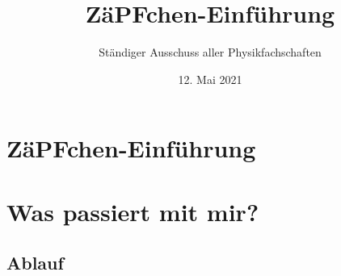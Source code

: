 \documentclass[compress,]{beamer}
\title[ZäPFchen-Einführung]{ZäPFchen-Einführung}
\author{Ständiger Ausschuss aller Physikfachschaften}
\institute[Zusammenkunft aller Physikfachschaften]
\date{12. Mai 2021}
\begin{document}
\begin{frame}
  \titlepage

\end{frame}

\section{ZäPFchen-Einführung}



\section{Was passiert mit mir?}

\subsection{Ablauf}
\end{document}

